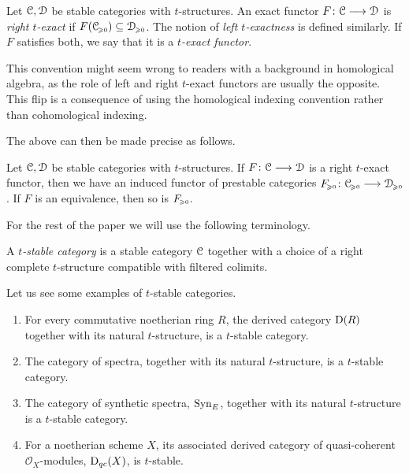 \begin{definition}
    Let $\EuScript{C}, \EuScript{D}$ be stable categories with $t$-structures. An exact functor $F\colon\EuScript{C}\longrightarrow\EuScript{D}$ is \emph{right $t$-exact} if $F(\EuScript{C}_{\hspace{-1pt}\scriptscriptstyle\geqslant 0})\subseteq \EuScript{D}_{\hspace{-1pt}\scriptscriptstyle\geqslant 0}$. The notion of \emph{left $t$-exactness} is defined similarly. If $F$ satisfies both, we say that it is a \emph{$t$-exact functor}. 
\end{definition}

\begin{remark}
    This convention might seem wrong to readers with a background in homological algebra, as the role of left and right $t$-exact functors are usually the opposite. This flip is a consequence of using the homological indexing convention rather than cohomological indexing. 
\end{remark}

The above can then be made precise as follows. 

\begin{lemma}
    Let $\EuScript{C}, \EuScript{D}$ be stable categories with $t$-structures. If $F\colon\EuScript{C}\longrightarrow\EuScript{D}$ is a right $t$-exact functor, then we have an induced functor of prestable categories $F_{\hspace{-1pt}\scriptscriptstyle\geqslant 0}\colon\EuScript{C}_{\hspace{-1pt}\scriptscriptstyle\geqslant 0}\longrightarrow\EuScript{D}_{\hspace{-1pt}\scriptscriptstyle\geqslant 0}$. If $F$ is an equivalence, then so is $F_{\hspace{-1pt}\scriptscriptstyle\geqslant 0}$. 
\end{lemma}

For the rest of the paper we will use the following terminology. 

\begin{definition}
    A \emph{$t$-stable category} is a stable category $\EuScript{C}$ together with a choice of a right complete $t$-structure compatible with filtered colimits. 
\end{definition}

\begin{example}
    Let us see some examples of $t$-stable categories. 
    \begin{enumerate}
        \item For every commutative noetherian ring $R$, the derived category $\mathrm{D}(R)$ together with its natural $t$-structure, is a $t$-stable category. 
        \item The category of spectra, together with its natural $t$-structure, is a $t$-stable category.
        \item The category of synthetic spectra, $\mathrm{Syn}_{E}$, together with its natural $t$-structure is a $t$-stable category. 
        \item For a noetherian scheme $X$, its associated derived category of quasi-coherent $\mathcal{O}_X$-modules, $\mathrm{D}_{qc}(X)$, is $t$-stable. 
    \end{enumerate}
\end{example}

